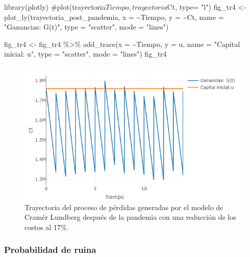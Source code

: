 \documentclass[
  us-letterpaper,
]{scrreprt}
\newenvironment{Shaded}{\begin{snugshade}}{\end{snugshade}}
\newcommand{\AttributeTok}[1]{\textcolor[rgb]{0.40,0.45,0.13}{#1}}
\newcommand{\CommentTok}[1]{\textcolor[rgb]{0.37,0.37,0.37}{#1}}
\newcommand{\FunctionTok}[1]{\textcolor[rgb]{0.28,0.35,0.67}{#1}}
\newcommand{\NormalTok}[1]{\textcolor[rgb]{0.00,0.23,0.31}{#1}}
\newcommand{\OtherTok}[1]{\textcolor[rgb]{0.00,0.23,0.31}{#1}}
\newcommand{\SpecialCharTok}[1]{\textcolor[rgb]{0.37,0.37,0.37}{#1}}
\newcommand{\StringTok}[1]{\textcolor[rgb]{0.13,0.47,0.30}{#1}}
\theoremstyle{plain}
\theoremstyle{plain}
\theoremstyle{definition}
\theoremstyle{remark}
\begin{document}
\begin{Shaded}
\begin{Highlighting}[]
\FunctionTok{library}\NormalTok{(plotly)}
\CommentTok{\#plot(trayectoria$Tiempo, trayectoria$Ct, type= "l")}
\NormalTok{fig\_tr4 }\OtherTok{\textless{}{-}} \FunctionTok{plot\_ly}\NormalTok{(trayectoria\_post\_pandemia, }\AttributeTok{x =} \SpecialCharTok{\textasciitilde{}}\NormalTok{Tiempo, }
                   \AttributeTok{y =} \SpecialCharTok{\textasciitilde{}}\NormalTok{Ct, }
         \AttributeTok{name =} \StringTok{"Ganancias: G(t)"}\NormalTok{,}
         \AttributeTok{type =} \StringTok{"scatter"}\NormalTok{, }\AttributeTok{mode =} \StringTok{"lines"}\NormalTok{)}

\NormalTok{fig\_tr4 }\OtherTok{\textless{}{-}}\NormalTok{ fig\_tr4 }\SpecialCharTok{\%\textgreater{}\%} \FunctionTok{add\_trace}\NormalTok{(}\AttributeTok{x =} \SpecialCharTok{\textasciitilde{}}\NormalTok{Tiempo, }\AttributeTok{y =}\NormalTok{ u,}
        \AttributeTok{name =} \StringTok{"Capital inicial: u"}\NormalTok{, }
        \AttributeTok{type =} \StringTok{"scatter"}\NormalTok{, }\AttributeTok{mode =} \StringTok{"lines"}\NormalTok{)}
\NormalTok{fig\_tr4}
\end{Highlighting}
\end{Shaded}

\begin{figure}[H]

{\centering \includegraphics{trayectoria4pdf.png}

}

\caption{Trayectoria del proceso de pérdidas generadas por el modelo de
Cramér Lundberg después de la pandemia con una reducción de los costos
al 17\%.}

\end{figure}%

\subsubsection{Probabilidad de ruina}\label{probabilidad-de-ruina-1}
\end{document}
